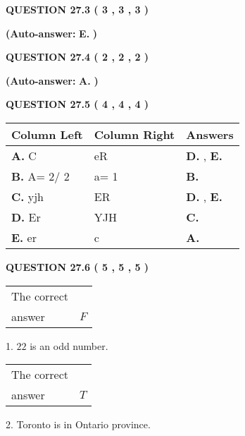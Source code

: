 \documentclass[12pt]{article}
\begin{document}
  
  
{\textbf{\large{QUESTION
27.3 
 (           3 ,           3 ,           3 )
}}}
 
 
{\textbf{(Auto-answer:}}
{\textbf{\large{
E.}}}
{\textbf{)}}
 
 
  
  
{\textbf{\large{QUESTION
27.4 
 (           2 ,           2 ,           2 )
}}}
 
 
{\textbf{(Auto-answer:}}
{\textbf{\large{
A.}}}
{\textbf{)}}
 
 
  
  
{\textbf{\large{QUESTION
27.5 
 (           4 ,           4 ,           4 )
}}}
 
 
\noindent{}
  
  
\begin{tabular}{|l|l|l|}
 \hline
 Column Left & Column Right  & Answers       \\ 
 \hline
{\textbf{\large{
A.}}}
C
  & 
eR
 & 
{\textbf{\large{
D.}}}
, 
{\textbf{\large{
E.}}}
 \\ 
 \hline
{\textbf{\large{
B.}}}
 A= %
2/ %
2

  & 
 a= %
1
 & 
{\textbf{\large{
B.}}}
 \\ 
 \hline
{\textbf{\large{
C.}}}
yjh
  & 
ER
 & 
{\textbf{\large{
D.}}}
, 
{\textbf{\large{
E.}}}
 \\ 
 \hline
{\textbf{\large{
D.}}}
Er
  & 
YJH
 & 
{\textbf{\large{
C.}}}
 \\ 
 \hline
{\textbf{\large{
E.}}}
er
  & 
c
 & 
{\textbf{\large{
A.}}}
 \\ 
 \hline
 \end{tabular}
  
  
\noindent{}
 
 
  
  
{\textbf{\large{QUESTION
27.6 
 (           5 ,           5 ,           5 )
}}}

 
\noindent\begin{tabular}{|l|l|}\hline The correct & \\
          answer &  %
$F$ \\ \hline \end{tabular}
1. $ %
22$ is an  %
odd number.
 
\noindent\begin{tabular}{|l|l|}\hline The correct & \\
          answer &  %
$T$ \\ \hline \end{tabular}
2.  %
Toronto is in  %
Ontario province.
 
\end{document}
